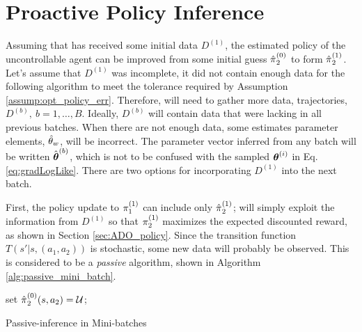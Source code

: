\chapter{Proactive Policy Inference}\label{chapt:proactive_inference}

    Assuming that  has received some initial data $D^{(1)}$, the estimated policy of the uncontrollable agent
    can be improved from some initial guess $\hat{\pi_{}}_2^{(0)}$ to form $\hat{\pi_{}}_2^{(1)}$. Let's
    assume that $D^{(1)}$ was incomplete, it did not contain enough data for the following algorithm to meet the
    tolerance required by Assumption \ref{assump:opt_policy_err}. Therefore,  will need to gather more data,
    trajectories, $D^{(b)},\ b=1,\ldots,B$. Ideally, $D^{(b)}$ will contain data that were lacking in all previous
    batches. When there are not enough data, some estimates parameter elements, $\hat{\theta}_{w}$, will be
    incorrect. The parameter vector inferred from any batch will be written $\hat{\boldsymbol{\mathbb{\theta}}}^{(b)}$, which is not
    to be confused with the sampled $\boldsymbol{\mathbb{\theta}}^{(i)}$ in Eq. \ref{eq:gradLogLike}. There are two options for
    incorporating $D^{(1)}$ into the next batch.

    First, the policy update to $\pi_{1}^{(1)}$ can include only $\hat{\pi_{}}_2^{(1)}$;  will
    simply exploit the information from $D^{(1)}$ so that $\pi_{2}^{(1)}$ maximizes the expected discounted reward,
    as shown in Section \ref{sec:ADO_policy}. Since the transition function $T(s'|s,(a_1,a_2)) $ is stochastic, some new
    data will probably be observed. This is considered to be a \textit{passive} algorithm, shown in Algorithm
    \ref{alg:passive_mini_batch}.
    \begin{algorithm}\label{alg:passive_mini_batch}
        set $\hat{\pi_{}}_2^{(0)}(s,a_2) = \mathcal{U}$;\\
        \caption{Passive-inference in Mini-batches}
    \end{algorithm}

